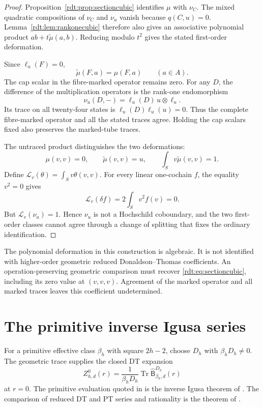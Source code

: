 \begin{proof}
Proposition~\ref{rdt:prop:sectioncubic} identifies $\mu$ with $\nu_C$.
The mixed quadratic compositions of $\nu_C$ and $\nu_u$ vanish
because $q(C,u)=0$.
Lemma~\ref{rdt:lem:rankonecubic} therefore also gives an associative
polynomial product $ab+t\widetilde\mu(a,b)$.
Reducing modulo $t^2$ gives the stated first-order deformation.

Since $\ell_u(F)=0$,
\[
 \widetilde\mu(F,a)=\mu(F,a)\qquad(a\in A).
\]
The cap scalar in the fibre-marked operator remains zero.
For any $D$, the difference of the multiplication operators is
the rank-one endomorphism
\[
 \nu_u(D,-)=\ell_u(D)\,u\otimes\ell_u.
\]
Its trace on all twenty-four states is
$\ell_u(D)\ell_u(u)=0$.
Thus the complete fibre-marked operator and all the stated traces
agree. Holding the cap scalars fixed also preserves the
marked-tube traces.

The untraced product distinguishes the two deformations:
\[
 \mu(v,v)=0,\qquad
 \widetilde\mu(v,v)=u,\qquad
 \int_Sv\widetilde\mu(v,v)=1.
\]
Define $\mathcal L_v(\theta)=\int_Sv\theta(v,v)$.
For every linear one-cochain $f$, the equality $v^2=0$ gives
\[
 \mathcal L_v(\delta f)
       =2\int_Sv^2f(v)=0.
\]
But $\mathcal L_v(\nu_u)=1$.
Hence $\nu_u$ is not a Hochschild coboundary, and the two
first-order classes cannot agree through a change of splitting
that fixes the ordinary identification.
\end{proof}

The polynomial deformation in this construction is algebraic.
It is not identified with higher-order geometric reduced
Donaldson--Thomas coefficients.
An operation-preserving geometric comparison must recover
\eqref{rdt:eq:sectioncubic}, including its zero value at $(v,v,v)$.
Agreement of the marked operator and all marked traces leaves
this coefficient undetermined.

\section{The primitive inverse Igusa series}
\label{rdt:sec:Igusa}

For a primitive effective class $\beta_h$ with square $2h-2$, choose
$D_h$ with $\beta_hD_h\ne0$. The geometric trace supplies the
closed DT expansion
\[
 Z_{h,d}^{0}(r)=\frac{1}{\beta_hD_h}\operatorname{Tr}\widehat{\mathsf B}^{D_h}_{\beta_h,d}(r)
\]
at $r=0$. The primitive evaluation quoted in
\cite[Remark 1.2, equation (3)]{OberdieckMC} is the inverse Igusa
theorem of \cite{OB}. The comparison of reduced DT and
PT series and rationality is the theorem of
\cite{OberdieckReducedPT}.


